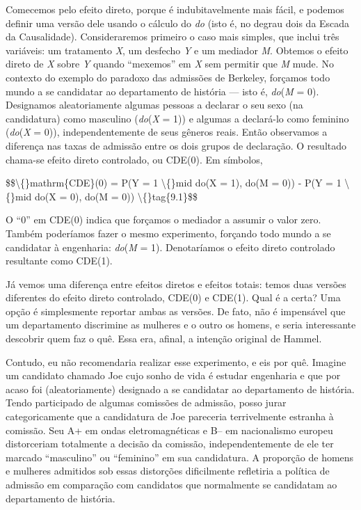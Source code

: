 \documentclass[11pt,a5paper,twoside]{book}
\begin{document}
Comecemos pelo efeito direto, porque é indubitavelmente mais fácil, e podemos definir uma versão dele usando o cálculo do \textit{do} (isto é, no degrau dois da Escada da Causalidade). Consideraremos primeiro o caso mais simples, que inclui três variáveis: um tratamento \textit{X}, um desfecho \textit{Y} e um mediador \textit{M}. Obtemos o efeito direto de \textit{X} sobre \textit{Y} quando “mexemos” em \textit{X} sem permitir que \textit{M} mude. No contexto do exemplo do paradoxo das admissões de Berkeley, forçamos todo mundo a se candidatar ao departamento de história — isto é, \textit{do}(\textit{M} = 0). Designamos aleatoriamente algumas pessoas a declarar o seu sexo (na candidatura) como masculino (\textit{do}(\textit{X} = 1)) e algumas a declará-lo como feminino (\textit{do}(\textit{X} = 0)), independentemente de seus gêneros reais. Então observamos a diferença nas taxas de admissão entre os dois grupos de declaração. O resultado chama-se efeito direto controlado, ou CDE(0). Em símbolos,

\$\$\textbackslash\{\}mathrm\{CDE\}(0) = P(Y = 1 \textbackslash\{\}mid do(X = 1), do(M = 0)) - P(Y = 1 \textbackslash\{\}mid do(X = 0), do(M = 0)) \textbackslash\{\}tag\{9.1\}\$\$

O “0” em CDE(0) indica que forçamos o mediador a assumir o valor zero. Também poderíamos fazer o mesmo experimento, forçando todo mundo a se candidatar à engenharia: \textit{do}(\textit{M} = 1). Denotaríamos o efeito direto controlado resultante como CDE(1).

Já vemos uma diferença entre efeitos diretos e efeitos totais: temos duas versões diferentes do efeito direto controlado, CDE(0) e CDE(1). Qual é a certa? Uma opção é simplesmente reportar ambas as versões. De fato, não é impensável que um departamento discrimine as mulheres e o outro os homens, e seria interessante descobrir quem faz o quê. Essa era, afinal, a intenção original de Hammel.

Contudo, eu não recomendaria realizar esse experimento, e eis por quê. Imagine um candidato chamado Joe cujo sonho de vida é estudar engenharia e que por acaso foi (aleatoriamente) designado a se candidatar ao departamento de história. Tendo participado de algumas comissões de admissão, posso jurar categoricamente que a candidatura de Joe pareceria terrivelmente estranha à comissão. Seu A+ em ondas eletromagnéticas e B– em nacionalismo europeu distorceriam totalmente a decisão da comissão, independentemente de ele ter marcado “masculino” ou “feminino” em sua candidatura. A proporção de homens e mulheres admitidos sob essas distorções dificilmente refletiria a política de admissão em comparação com candidatos que normalmente se candidatam ao departamento de história.
\end{document}

